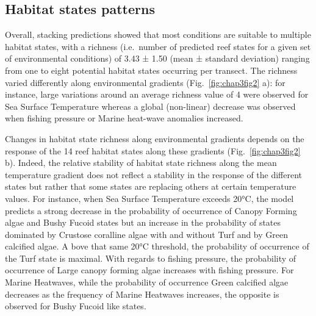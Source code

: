 \begin{refsection}
{\subsection{Habitat states patterns}\label{habitat-states-patterns}}

Overall, stacking predictions showed that most conditions are suitable
to multiple habitat states, with a richness (i.e.~number of predicted
reef states for a given set of environmental conditions) of 3.43 ± 1.50
(mean ± standard deviation) ranging from one to eight potential habitat
states occurring per transect. The richness varied differently along
environmental gradients (Fig.~\ref{fig:chap3fig2} a): for instance,
large variations around an average richness value of 4 were observed for
Sea Surface Temperature whereas a global (non-linear) decrease was
observed when fishing pressure or Marine heat-wave anomalies increased.

Changes in habitat state richness along environmental gradients depends
on the response of the 14 reef habitat states along these gradients
(Fig.~\ref{fig:chap3fig2} b). Indeed, the relative stability of habitat
state richness along the mean temperature gradient does not reflect a
stability in the response of the different states but rather that some
states are replacing others at certain temperature values. For instance,
when Sea Surface Temperature exceeds 20°C, the model predicts a strong
decrease in the probability of occurrence of Canopy Forming algae and
Bushy Fucoid states but an increase in the probability of states
dominated by Crustose coralline algae with and without Turf and by Green
calcified algae. A bove that same 20°C threshold, the probability of
occurrence of the Turf state is maximal. With regards to fishing
pressure, the probability of occurrence of Large canopy forming algae
increases with fishing pressure. For Marine Heatwaves, while the
probability of occurrence Green calcified algae decreases as the
frequency of Marine Heatwaves increases, the opposite is observed for
Bushy Fucoid like states.


\end{refsection}
